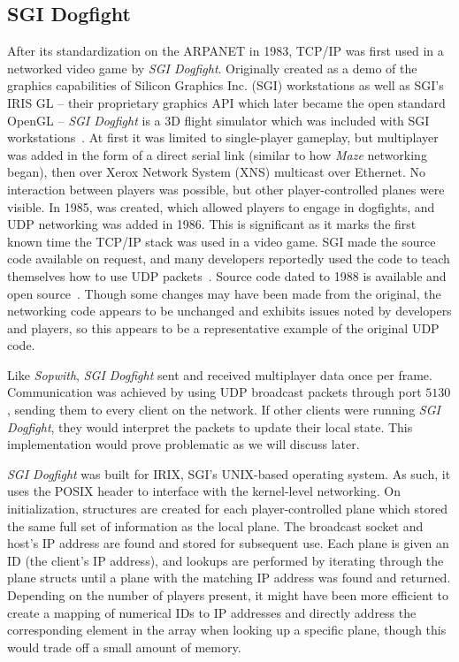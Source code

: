 \subsection{SGI Dogfight}\label{subsec:sgidogfight}

After its standardization on the ARPANET in 1983, TCP/IP was first used in a networked video game by \textit{SGI Dogfight}. Originally created as a demo of the graphics capabilities of Silicon Graphics Inc. (SGI) workstations as well as SGI's IRIS GL -- their proprietary graphics API which later became the open standard OpenGL -- \textit{SGI Dogfight} is a 3D flight simulator which was included with SGI workstations~\cite{zyda}. At first it was limited to single-player gameplay, but multiplayer was added in the form of a direct serial link (similar to how \textit{Maze} networking began), then over Xerox Network System (XNS) multicast over Ethernet. No interaction between players was possible, but other player-controlled planes were visible. In 1985,  was created, which allowed players to engage in dogfights, and UDP networking was added in 1986. This is significant as it marks the first known time the TCP/IP stack was used in a video game. SGI made the source code available on request, and many developers reportedly used the code to teach themselves how to use UDP packets~\cite{zyda}. Source code dated to 1988 is available and open source~\cite{dogsrc}. Though some changes may have been made from the original, the networking code appears to be unchanged and exhibits issues noted by developers and players, so this appears to be a representative example of the original UDP code.

Like \textit{Sopwith}, \textit{SGI Dogfight} sent and received multiplayer data once per frame. Communication was achieved by using UDP broadcast packets through port $5130$, sending them to every client on the network. If other clients were running \textit{SGI Dogfight}, they would interpret the packets to update their local state. This implementation would prove problematic as we will discuss later.

\textit{SGI Dogfight} was built for IRIX, SGI's UNIX-based operating system. As such, it uses the  POSIX header to interface with the kernel-level networking.
On initialization, structures are created for each player-controlled plane which stored the same full set of information as the local plane. The broadcast socket and host's IP address are found and stored for subsequent use. Each plane is given an ID (the client's IP address), and lookups are performed by iterating through the plane structs until a plane with the matching IP address was found and returned. Depending on the number of players present, it might have been more efficient to create a mapping of numerical IDs to IP addresses and directly address the corresponding element in the array when looking up a specific plane, though this would trade off a small amount of memory.


